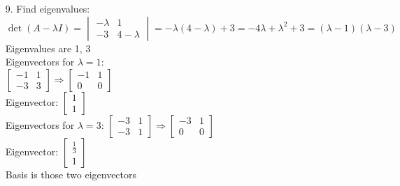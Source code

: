 \documentclass[leqno]{article}
\begin{document}
\begin{enumerate}
    \item[9.]
    Find eigenvalues:
    $\det(A - \lambda I) = \begin{vmatrix}-\lambda & 1 \\ -3 & 4 - \lambda\end{vmatrix} = -\lambda(4 - \lambda) + 3 = -4\lambda + \lambda^2 + 3 = (\lambda - 1)(\lambda - 3)$\\
    Eigenvalues are 1, 3\\
    Eigenvectors for $\lambda = 1$:\\
    $\begin{bmatrix}-1 & 1 \\ -3 & 3\end{bmatrix} \Rightarrow \begin{bmatrix}-1 & 1 \\ 0 & 0\end{bmatrix}$\\
    Eigenvector: $\begin{bmatrix}1 \\ 1\end{bmatrix}$\\
    Eigenvectors for $\lambda = 3$:
    $\begin{bmatrix}-3 & 1 \\ -3 & 1\end{bmatrix} \Rightarrow \begin{bmatrix}-3 & 1 \\ 0 & 0\end{bmatrix}$\\
    Eigenvector: $\begin{bmatrix}\frac 1 3 \\ 1\end{bmatrix}$\\
    Basis is those two eigenvectors


\end{enumerate}
\end{document}
